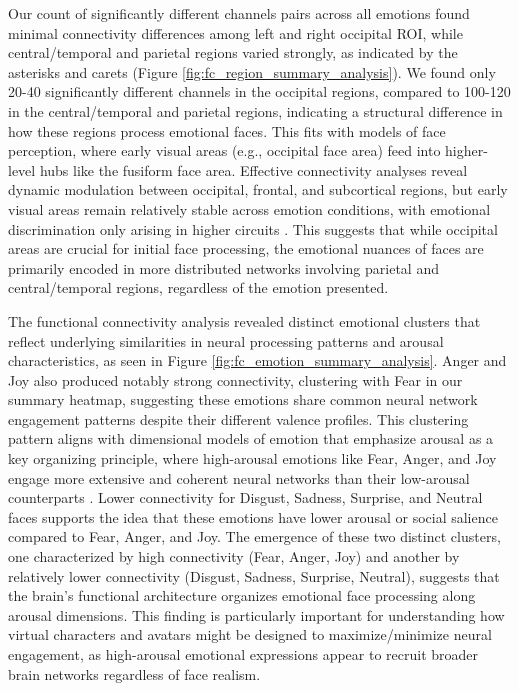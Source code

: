 Our count of significantly different channels pairs across all emotions found minimal connectivity differences among left and right occipital ROI, while central/temporal and parietal regions varied strongly, as indicated by the asterisks and carets (Figure \ref{fig:fc_region_summary_analysis}).
We found only 20-40 significantly different channels in the occipital regions, compared to 100-120 in the central/temporal and parietal regions, indicating a structural difference in how these regions process emotional faces.
This fits with models of face perception, where early visual areas (e.g., occipital face area) feed into higher-level hubs like the fusiform face area. 
Effective connectivity analyses reveal dynamic modulation between occipital, frontal, and subcortical regions, but early visual areas remain relatively stable across emotion conditions, with emotional discrimination only arising in higher circuits \citep{underwood_networks_2021}. 
This suggests that while occipital areas are crucial for initial face processing, the emotional nuances of faces are primarily encoded in more distributed networks involving parietal and central/temporal regions, regardless of the emotion presented.

The functional connectivity analysis revealed distinct emotional clusters that reflect underlying similarities in neural processing patterns and arousal characteristics, as seen in Figure \ref{fig:fc_emotion_summary_analysis}.
Anger and Joy also produced notably strong connectivity, clustering with Fear in our summary heatmap, suggesting these emotions share common neural network engagement patterns despite their different valence profiles.
This clustering pattern aligns with dimensional models of emotion that emphasize arousal as a key organizing principle, where high-arousal emotions like Fear, Anger, and Joy engage more extensive and coherent neural networks than their low-arousal counterparts \citep{ke_dynamic_2025}.
Lower connectivity for Disgust, Sadness, Surprise, and Neutral faces supports the idea that these emotions have lower arousal or social salience compared to Fear, Anger, and Joy.
The emergence of these two distinct clusters, one characterized by high connectivity (Fear, Anger, Joy) and another by relatively lower connectivity (Disgust, Sadness, Surprise, Neutral), suggests that the brain's functional architecture organizes emotional face processing along arousal dimensions. 
This finding is particularly important for understanding how virtual characters and avatars might be designed to maximize/minimize neural engagement, as high-arousal emotional expressions appear to recruit broader brain networks regardless of face realism.


